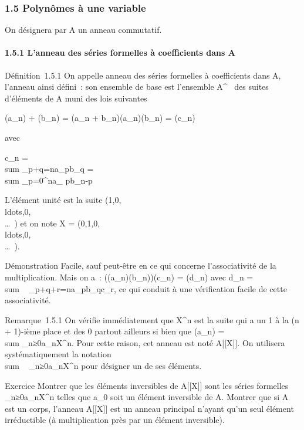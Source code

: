 
\subsubsection{1.5 Polynômes à une variable}

On désignera par A un anneau commutatif.

\paragraph{1.5.1 L'anneau des séries formelles à coefficients dans A}

Définition~1.5.1 On appelle anneau des séries formelles à coefficients
dans A, l'anneau ainsi défini~: son ensemble de base est l'ensemble
A^~ des suites d'éléments de A muni des lois suivantes

(a_n) + (b_n) = (a_n +
b_n)\quad (a_n)(b_n) =
(c_n)

avec

c_n = \\sum
_p+q=na_pb_q = \\sum
_p=0^na_ pb_n-p

L'élément unité est la suite
(1,0,\\ldots,0,\\\ldots~)
et on note X =
(0,1,0,\\ldots,0,\\\ldots~).

Démonstration Facile, sauf peut-être en ce qui concerne l'associativité
de la multiplication. Mais on a~:
((a_n)(b_n))(c_n) = (d_n) avec
d_n = \\sum ~
_p+q+r=na_pb_qc_r, ce qui conduit à
une vérification facile de cette associativité.

Remarque~1.5.1 On vérifie immédiatement que X^n est la suite
qui a un 1 à la (n + 1)-ième place et des 0 partout ailleurs si bien que
(a_n) =\ \\sum
 _n≥0a_nX^n. Pour cette raison, cet
anneau est noté A{[}{[}X{]}{]}. On utilisera systématiquement la
notation \\sum ~
_n≥0a_nX^n pour désigner un de ses éléments.

Exercice Montrer que les éléments inversibles de A{[}{[}X{]}{]} sont les
séries formelles \\\sum
 _n≥0a_nX^n telles que a_0 soit
un élément inversible de A. Montrer que si A est un corps, l'anneau
A{[}{[}X{]}{]} est un anneau principal n'ayant qu'un seul élément
irréductible (à multiplication près par un élément inversible).

